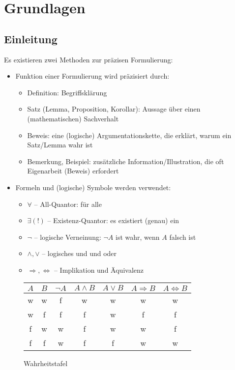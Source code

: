 \chapter{Grundlagen}
\section*{Einleitung}
	Es existieren zwei Methoden zur präzisen Formulierung:
	\begin{itemize}
	\item Funktion einer Formulierung wird präzisiert durch:
		\begin{itemize}
			\item Definition: Begriffsklärung
			\item Satz (Lemma, Proposition, Korollar): Aussage über einen (mathematischen) Sachverhalt
			\item Beweis: eine (logische) Argumentationskette, die erklärt, warum ein Satz/Lemma wahr ist
			\item Bemerkung, Beispiel: zusätzliche Information/Illustration, die oft Eigenarbeit (Beweis) erfordert
		\end{itemize}
	\item Formeln und (logische) Symbole werden verwendet:
		\begin{itemize}
			\item $\forall$ -- All-Quantor: \glqq für alle\grqq
			\item $\exists(!)$ -- Existenz-Quantor: \glqq es existiert (genau) ein\grqq
			\item $\lnot$ -- logische Verneinung: $\lnot A$ ist wahr, wenn $A$ falsch ist
			\item $\land ,\lor$ -- logisches \glqq und\grqq{} und \glqq oder\grqq
			\item $\Rightarrow ,\Leftrightarrow$ -- Implikation und Äquivalenz
		\end{itemize}
	\end{itemize}

	\begin{figure}[H]\centering
		\begin{tabular}{c|c|c|c|c|c|c}
			$A$ & $B$ & $\lnot A$ & $A\land B$ &$A\lor B$&$A \Rightarrow B$ & $A\Leftrightarrow B$\\\hline
			w & w & f & w & w & w & w\\
			w & f & f & f & w & f & f\\
			f & w & w & f & w & w & f\\
			f & f & w & f & f & w & w\\
		\end{tabular}
	\caption{Wahrheitstafel}
	\end{figure}

